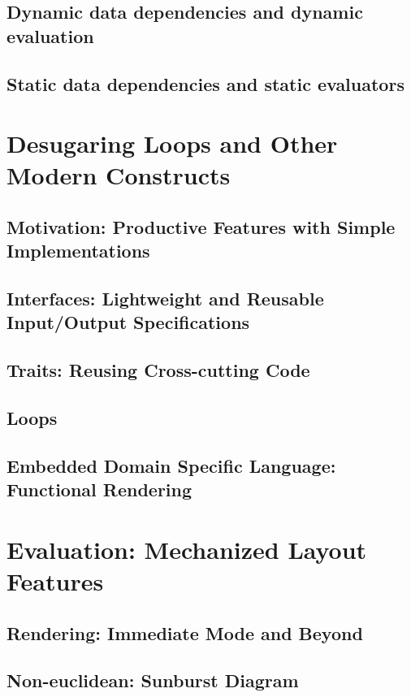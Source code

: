 \subsection{Dynamic data dependencies and dynamic evaluation}


\subsection{Static data dependencies and static evaluators}


\section{Desugaring Loops and Other Modern Constructs}
\label{sec:desugaring}
\subsection{Motivation: Productive Features with Simple Implementations}
\subsection{Interfaces: Lightweight and Reusable Input/Output Specifications}
\subsection{Traits: Reusing Cross-cutting Code}
\subsection{Loops}
\subsection{Embedded Domain Specific Language: Functional Rendering}



\section{Evaluation: Mechanized Layout Features}





\subsection{Rendering: Immediate Mode and Beyond}
\subsection{Non-euclidean: Sunburst Diagram}
